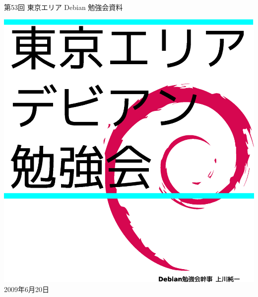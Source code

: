\documentclass[mingoth,a4paper]{jsarticle}
\newcommand{\debmtgyear}{2009}
\newcommand{\debmtgmonth}{6}
\newcommand{\debmtgdate}{20}
\newcommand{\debmtgnumber}{53}
\begin{document}
\begin{titlepage}
\thispagestyle{empty}


\vspace*{-2cm}
第\debmtgnumber{}回 東京エリア Debian 勉強会資料

\hspace*{-2.4cm}
\includegraphics[width=210mm]{image200801/2008title.eps}\\
\hfill{}\debmtgyear{}年\debmtgmonth{}月\debmtgdate{}日

\end{titlepage}

\end{document}
